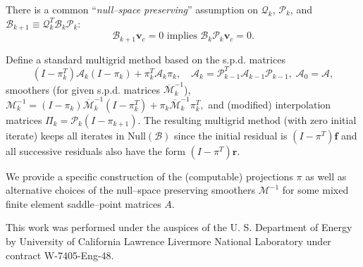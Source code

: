 \documentclass{report}
\begin{document}
There is a common ``{\it null--space preserving}'' assumption on
${\mathcal Q}_k$, ${\mathcal P}_k$, and
${\mathcal B}_{k+1} \equiv {\mathcal Q}^T_k {\mathcal B}_k {\mathcal
P}_k$:
$$
{\mathcal B}_{k+1} {\mathbf v}_c =0
\text{ implies }
{\mathcal B}_k {\mathcal P}_k {\mathbf v}_c = 0.
$$

Define a standard multigrid method based on the s.p.d. matrices
$$
(I-\pi^T_k){\mathcal A}_k(I-\pi_k) + \pi^T_k {\mathcal A}_k \pi_k,
\quad {\mathcal A}_k =
{\mathcal P}^T_{k-1} {\mathcal A}_{k-1} {\mathcal P}_{k-1},\;
{\mathcal A}_0 = {\mathcal A},
$$
smoothers (for given s.p.d. matrices ${\overline {\mathcal
M}}^{-1}_k$),${\mathcal M}^{-1}_k = (I-\pi_k){\overline {\mathcal
M}}^{-1}_k(I-\pi^T_k)+ \pi_k {\overline {\mathcal M}}^{-1}_k\pi^T_k,
$
and (modified) interpolation matrices $\Pi_k={\mathcal P}_k (I-\pi_{k+1}).$
The resulting multigrid method (with zero initial iterate)
keeps all iterates in $\text{Null}({\mathcal B})$ since the initial
residual is $(I-\pi^T){\mathbf f}$ and all successive residuals also have
the form $(I-\pi^T){\mathbf r}$.

We provide a specific construction of the (computable) projections $\pi$
as well as alternative choices of the null--space preserving smoothers
${\mathcal M}^{-1}$
for some mixed finite element saddle--point matrices $A$.

This work was performed under the auspices of the U. S. Department of
Energy by University of California Lawrence Livermore National Laboratory
under contract W-7405-Eng-48.
\end{document}

